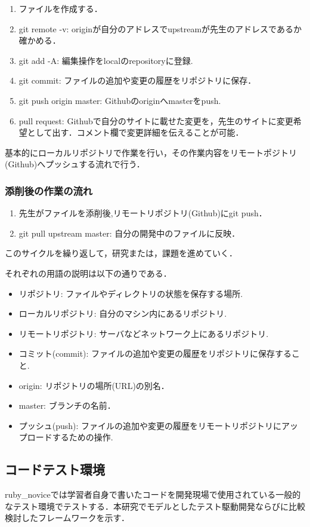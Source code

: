 \begin{enumerate}
\item ファイルを作成する．
\item git remote -v: originが自分のアドレスでupstreamが先生のアドレスであるか確かめる．
\item git add -A: 編集操作をlocalのrepositoryに登録.
\item git commit: ファイルの追加や変更の履歴をリポジトリに保存．
\item git push origin master: Githubのoriginへmasterをpush.
\item pull request: Githubで自分のサイトに載せた変更を，先生のサイトに変更希望として出す．コメント欄で変更詳細を伝えることが可能．
\end{enumerate}
基本的にローカルリポジトリで作業を行い，その作業内容をリモートポジトリ(Github)へプッシュする流れで行う．

\subsubsection{添削後の作業の流れ}
\begin{enumerate}
\item 先生がファイルを添削後,リモートリポジトリ(Github)にgit push．
\item git pull upstream master: 自分の開発中のファイルに反映．
\end{enumerate}
このサイクルを繰り返して，研究または，課題を進めていく．

それぞれの用語の説明は以下の通りである．

\begin{itemize}
\item リポジトリ:          ファイルやディレクトリの状態を保存する場所.
\item ローカルリポジトリ:  自分のマシン内にあるリポジトリ.
\item リモートリポジトリ:  サーバなどネットワーク上にあるリポジトリ.
\item コミット(commit):    ファイルの追加や変更の履歴をリポジトリに保存すること.
\item origin:              リポジトリの場所(URL)の別名．
\item master:              ブランチの名前．
\item プッシュ(push):      ファイルの追加や変更の履歴をリモートリポジトリにアップロードするための操作.
\end{itemize}
\subsection{コードテスト環境}
ruby\_noviceでは学習者自身で書いたコードを開発現場で使用されている一般的なテスト環境でテストする．本研究でモデルとしたテスト駆動開発ならびに比較検討したフレームワークを示す．

